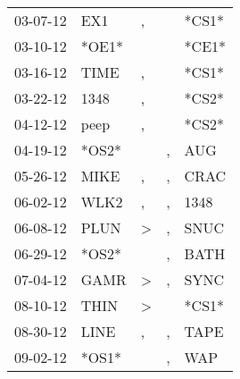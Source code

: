 \begin{supertabular}{p{0.07\textwidth}p{0.06\textwidth}p{0.02\textwidth}p{0.02\textwidth}p{0.06\textwidth}}
          03-07-12\textsuperscript{} &            EX1\textsuperscript{} &                , &                  &                            *CS1* \\
          03-10-12\textsuperscript{} &                            *OE1* &                  &                  &                            *CE1* \\
          03-16-12\textsuperscript{} &           TIME\textsuperscript{} &                , &                  &                            *CS1* \\
          03-22-12\textsuperscript{} &           1348\textsuperscript{} &                , &                  &                            *CS2* \\
          04-12-12\textsuperscript{} &           peep\textsuperscript{} &                , &                  &                            *CS2* \\
          04-19-12\textsuperscript{} &                            *OS2* &                  &                , &            AUG\textsuperscript{} \\
          05-26-12\textsuperscript{} &           MIKE\textsuperscript{} &                , &                , &           CRAC\textsuperscript{} \\
          06-02-12\textsuperscript{} &           WLK2\textsuperscript{} &                , &                , &           1348\textsuperscript{} \\
          06-08-12\textsuperscript{} &           PLUN\textsuperscript{} &     \textgreater &                , &           SNUC\textsuperscript{} \\
          06-29-12\textsuperscript{} &                            *OS2* &                  &                , &           BATH\textsuperscript{} \\
          07-04-12\textsuperscript{} &           GAMR\textsuperscript{} &     \textgreater &                , &           SYNC\textsuperscript{} \\
          08-10-12\textsuperscript{} &           THIN\textsuperscript{} &     \textgreater &                  &                            *CS1* \\
          08-30-12\textsuperscript{} &           LINE\textsuperscript{} &                , &                , &           TAPE\textsuperscript{} \\
          09-02-12\textsuperscript{} &                            *OS1* &                  &                , &            WAP\textsuperscript{} \\

\end{supertabular}

